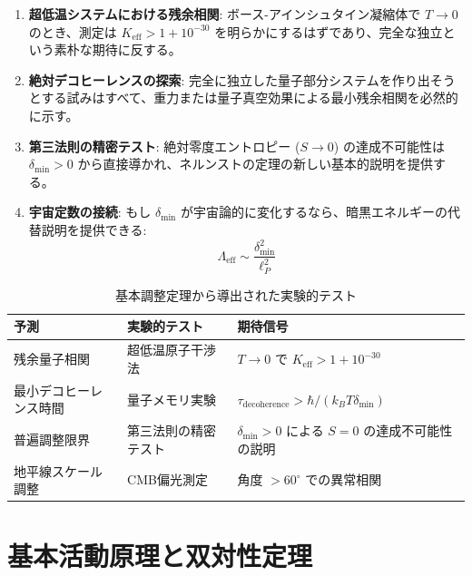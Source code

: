 \documentclass[11pt,a4paper]{article}
\begin{document}
	\begin{enumerate}
		\item \textbf{超低温システムにおける残余相関}: ボース-アインシュタイン凝縮体で $T \to 0$ のとき、測定は $K_{\mathrm{eff}} > 1 + 10^{-30}$ を明らかにするはずであり、完全な独立という素朴な期待に反する。
		
		\item \textbf{絶対デコヒーレンスの探索}: 完全に独立した量子部分システムを作り出そうとする試みはすべて、重力または量子真空効果による最小残余相関を必然的に示す。
		
		\item \textbf{第三法則の精密テスト}: 絶対零度エントロピー ($S \to 0$) の達成不可能性は $\delta_{\min} > 0$ から直接導かれ、ネルンストの定理の新しい基本的説明を提供する。
		
		\item \textbf{宇宙定数の接続}: もし $\delta_{\min}$ が宇宙論的に変化するなら、暗黒エネルギーの代替説明を提供できる:
		\begin{equation}
			\Lambda_{\mathrm{eff}} \sim \frac{\delta_{\min}^2}{\ell_P^2}
		\end{equation}
	\end{enumerate}
	
	\begin{table}[htbp]
		\centering
		\small
	
			\begin{tabular}{p{}p{}p{}}
				\toprule
				\textbf{予測} & \textbf{実験的テスト} & \textbf{期待信号} \\
				\midrule
				残余量子相関 & 超低温原子干渉法 & $T \to 0$ で $K_{\mathrm{eff}} > 1 + 10^{-30}$ \\
				最小デコヒーレンス時間 & 量子メモリ実験 & $\tau_{\text{decoherence}} > \hbar/(k_B T \delta_{\min})$ \\
				普遍調整限界 & 第三法則の精密テスト & $\delta_{\min}>0$ による $S=0$ の達成不可能性の説明 \\
				地平線スケール調整 & CMB偏光測定 & 角度 $>60^\circ$ での異常相関 \\
				\bottomrule
			\end{tabular}

		\caption{基本調整定理から導出された実験的テスト}
		\label{tab:theorem-predictions}
	\end{table}
	
	\section{基本活動原理と双対性定理}
	\label{sec:activity_principle}
	
\end{document}
